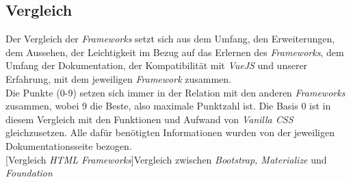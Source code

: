 	\subsection{Vergleich}
	\label{chapter:study-frontend-vergleich}
	Der Vergleich der \textit{Frameworks} setzt sich aus dem Umfang, den Erweiterungen, dem Aussehen, der Leichtigkeit im Bezug auf das Erlernen des \textit{Frameworks}, dem Umfang der Dokumentation, der Kompatibilität mit \textit{VueJS} und unserer Erfahrung, mit dem jeweiligen \textit{Framework} zusammen.\\
	Die Punkte (0-9) setzen sich immer in der Relation mit den anderen \textit{Frameworks} zusammen, wobei 9 die Beste, also maximale Punktzahl ist. Die Basis 0 ist in diesem Vergleich mit den Funktionen und Aufwand von \textit{Vanilla CSS} gleichzusetzen. Alle dafür benötigten Informationen wurden von der jeweiligen Dokumentationsseite bezogen.
	~\\
	[Vergleich \textit{HTML Frameworks}]{Vergleich zwischen\textit{ Bootstrap, Materialize} und \textit{Foundation}}\label{tbl:comparison}
